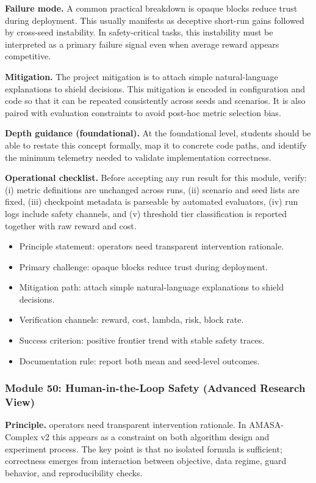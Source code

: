 \documentclass[conference]{IEEEtran}
\begin{document}
\textbf{Failure mode.} A common practical breakdown is opaque blocks reduce trust during deployment. This usually manifests as deceptive short-run gains followed by cross-seed instability. In safety-critical tasks, this instability must be interpreted as a primary failure signal even when average reward appears competitive.

\textbf{Mitigation.} The project mitigation is to attach simple natural-language explanations to shield decisions. This mitigation is encoded in configuration and code so that it can be repeated consistently across seeds and scenarios. It is also paired with evaluation constraints to avoid post-hoc metric selection bias.

\textbf{Depth guidance (foundational).} At the foundational level, students should be able to restate this concept formally, map it to concrete code paths, and identify the minimum telemetry needed to validate implementation correctness.

\textbf{Operational checklist.} Before accepting any run result for this module, verify: (i) metric definitions are unchanged across runs, (ii) scenario and seed lists are fixed, (iii) checkpoint metadata is parseable by automated evaluators, (iv) run logs include safety channels, and (v) threshold tier classification is reported together with raw reward and cost.

\begin{itemize}[leftmargin=*]
  \item Principle statement: operators need transparent intervention rationale.
  \item Primary challenge: opaque blocks reduce trust during deployment.
  \item Mitigation path: attach simple natural-language explanations to shield decisions.
  \item Verification channels: reward, cost, lambda, risk, block rate.
  \item Success criterion: positive frontier trend with stable safety traces.
  \item Documentation rule: report both mean and seed-level outcomes.
\end{itemize}


\subsubsection{Module 50: Human-in-the-Loop Safety (Advanced Research View)}
\textbf{Principle.} operators need transparent intervention rationale. In AMASA-Complex v2 this appears as a constraint on both algorithm design and experiment process. The key point is that no isolated formula is sufficient; correctness emerges from interaction between objective, data regime, guard behavior, and reproducibility checks.
\end{document}
